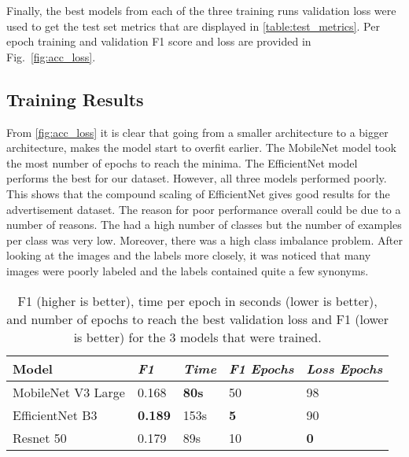 \documentclass[conference]{IEEEtran}
\begin{document}
Finally, the best models from each of the three training runs validation loss were used 
to get the test set metrics that are displayed in \ref{table:test_metrics}. 
Per epoch training and validation F1 score and loss are provided in 
Fig.~\ref{fig:acc_loss}.

\subsection{Training Results}
From \ref{fig:acc_loss} it is clear that going from a smaller 
architecture to a bigger architecture, makes the model start to overfit earlier. 
The MobileNet model took the most number of epochs to reach 
the minima. The EfficientNet model performs the best for our dataset. However, 
all three models performed poorly. This shows that the compound scaling 
of EfficientNet gives good results for the advertisement dataset.
The reason for poor performance overall could be due to a number of reasons. 
The had a high number of classes but the number of examples per class was very low.
Moreover, there was a high class imbalance problem. After looking at the images and 
the labels more closely, it was noticed that many images were poorly labeled and the 
labels contained quite a few synonyms. 


\begin{table}[htbp]
    \caption{F1 (higher is better), time per epoch in seconds (lower is better), and number of epochs to reach the best validation loss and F1 (lower is better) for the 3 models that were trained.}
    \centering
    \boldmath
    \begin{tabular}{p{2cm}|p{1cm}|p{1cm}|p{1.2cm}|p{1cm}}
    \hline
    Model & \emph{F1} & \emph{Time} & \emph{F1 Epochs} & \emph{Loss Epochs}\\
    \hline
    MobileNet V3 Large & 0.168 & \textbf{80s} & 50 & 98\\
    \hline
    EfficientNet B3 & \textbf{0.189} & 153s & \textbf{5} & 90\\
    \hline
    Resnet 50 & 0.179 & 89s & 10 & \textbf{0}\\
    \hline
    \end{tabular}
    \label{tab:test_metrics}
    \end{table}
\end{document}
